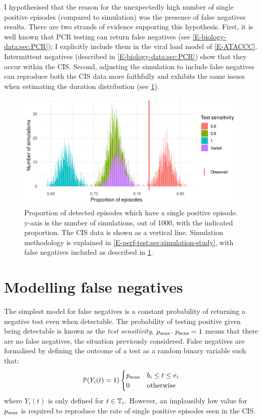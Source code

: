\documentclass[thesis.tex]{subfiles}
\begin{document}
I hypothesised that the reason for the unexpectedly high number of single positive episodes (compared to simulation) was the presence of false negatives results.
There are two strands of evidence supporting this hypothesis.
First, it is well known that PCR testing can return false negatives  (see \cref{E-biology-data:sec:PCR}); I explicitly include them in the viral load model of \cref{E-ATACCC}.
Intermittent negatives (described in  \cref{E-biology-data:sec:PCR}) show that they occur within the CIS.
Second, adjusting the simulation to include false negatives can reproduce both the CIS data more faithfully and exhibits the same issues when estimating the duration distribution (see \cref{imperf-test:fig:sim-single-pos}).
\begin{figure}
  \centering \includegraphics{cis-imperfect-testing/sim-single-positive-episodes}
  \caption[Single positive episodes in CIS simulation]{%
    Proportion of detected episodes which have a single positive episode.
    y-axis is the number of simulations, out of 1000, with the indicated proportion.
    The CIS data is shown as a vertical line.
    Simulation methodology is explained in \cref{E-perf-test:sec:simulation-study}, with false negatives included as described in \cref{imperf-test:sec:simulate}.
  }
  \label{imperf-test:fig:sim-single-pos}
\end{figure}

\section{Modelling false negatives} \label{imperf-test:sec:simulate}

The simplest model for false negatives is a constant probability of returning a negative test even when detectable.
The probability of testing positive given being detectable is known as the \emph{test sensitivity}, $p_\text{sens}$.
$p_\text{sens} = 1$ means that there are no false negatives, the situation previously considered.
False negatives are formalised by defining the outcome of a test as a random binary variable such that:
\begin{equation}
  \operatorname{\mathbb{P}}(Y_i(t) = 1) \begin{cases}
      p_\text{sens} &b_i \leq t \leq e_i \\
      0 &\text{otherwise}
  \end{cases} 
\end{equation}
where $Y_i(t)$ is only defined for $t \in \mathbb{T}_i$.
However, an implausibly low value for $p_\text{sens}$ is required to reproduce the rate of single positive episodes seen in the CIS.
\end{document}
